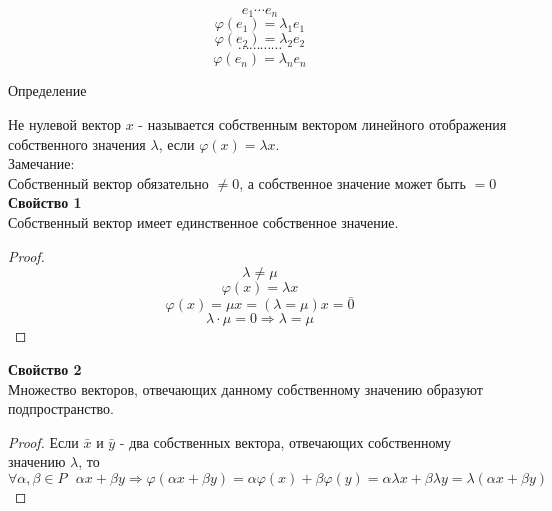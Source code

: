 \[e_1 \cdots e_n\]
\[\varphi(e_1) = \lambda_1 e_1\]
\[\varphi(e_2) = \lambda_2 e_2\]
\[\cdots \cdots \cdots \cdots\]
\[\varphi(e_n) = \lambda_n e_n\]

\begin{defin}
{Определение}
\end{defin}

Не нулевой вектор $x$ - называется собственным вектором линейного отображения
собственного значения $\lambda$, если $\varphi(x) = \lambda x$.\\

Замечание:\\
Собственный вектор обязательно $\ne 0$, а собственное значение может быть $= 0$\\

{\bf Свойство 1}\\
Собственный вектор имеет единственное собственное значение.\\
\begin{proof}
\[\lambda \ne \mu\]
\[\varphi(x) = \lambda x\]
\[\varphi(x) = \mu x = (\lambda = \mu)x = \bar{0}\]
\[\lambda \cdot \mu = 0 \Rightarrow \lambda = \mu\]
\end{proof}

{\bf Свойство 2}\\
Множество векторов, отвечающих данному собственному значению образуют
подпространство.\\
\begin{proof}
Если $\bar{x}$ и $\bar{y}$ - два собственных вектора, отвечающих собственному
значению $\lambda$, то \\
$\forall \alpha, \beta \in P ~~~ \alpha x + \beta y \Rightarrow
\varphi(\alpha x + \beta y) = \alpha \varphi(x) + \beta \varphi(y) =
\alpha \lambda x + \beta \lambda y = \lambda(\alpha x + \beta y)$\\
\end{proof}

